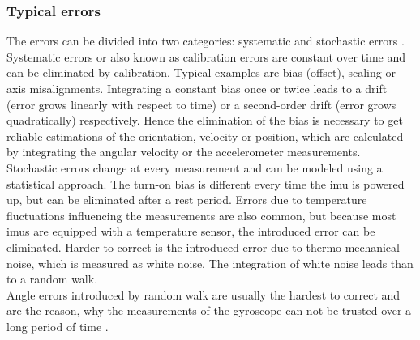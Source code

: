 \subsubsection{Typical  errors}
\label{sse:mems_errors}
The errors can be divided into two categories: systematic and stochastic errors \cite{Zhang2019}.
Systematic errors or also known as calibration errors are constant over time and can be eliminated by calibration.
Typical examples are bias (offset), scaling or axis misalignments.
Integrating a constant bias once or twice leads to a drift (error grows linearly with respect to time) or a second-order drift (error grows quadratically) respectively.
Hence the elimination of the bias is necessary to get reliable estimations of the orientation, velocity or position, which are calculated by integrating the angular velocity or the accelerometer measurements.\\
Stochastic errors change at every measurement and can be modeled using a statistical approach.
The turn-on bias is different every time the \gls{imu} is powered up, but can be eliminated after a rest period.
Errors due to temperature fluctuations influencing the measurements are also common, but because most \gls{imu}s are equipped with a temperature sensor, the introduced error can be eliminated.
Harder to correct is the introduced error due to thermo-mechanical noise, which is measured as white noise.
The integration of white noise leads than to a random walk.\\
Angle errors introduced by random walk are usually the hardest to correct and are the reason, why the measurements of the gyroscope can not be trusted over a long period of time \cite{Woodman2007}.


